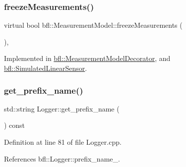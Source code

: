 \subsubsection{\texorpdfstring{freeze\+Measurements()}{freezeMeasurements()}}
{\footnotesize\ttfamily virtual bool bfl\+::\+Measurement\+Model\+::freeze\+Measurements (\begin{DoxyParamCaption}{ }\end{DoxyParamCaption})\hspace{0.3cm}{\ttfamily [pure virtual]}, {\ttfamily [inherited]}}



Implemented in \mbox{\hyperlink{classbfl_1_1MeasurementModelDecorator_a17d5fb12bfa048ca56160f745f112e32}{bfl\+::\+Measurement\+Model\+Decorator}}, and \mbox{\hyperlink{classbfl_1_1SimulatedLinearSensor_a683f147d792a79c5ad4c6746210dfdee}{bfl\+::\+Simulated\+Linear\+Sensor}}.

\mbox{\label{classbfl_1_1Logger_a913a795b7bfbf378815eeb342d68a7c0}} 
\subsubsection{\texorpdfstring{get\+\_\+prefix\+\_\+name()}{get\_prefix\_name()}}
{\footnotesize\ttfamily std\+::string Logger\+::get\+\_\+prefix\+\_\+name (\begin{DoxyParamCaption}{ }\end{DoxyParamCaption}) const\hspace{0.3cm}{\ttfamily [inherited]}}



Definition at line 81 of file Logger.\+cpp.



References bfl\+::\+Logger\+::prefix\+\_\+name\+\_\+.

\mbox{\label{classbfl_1_1Logger_a56cf1a4e712bf23d9978420a8a59a62b}} 
